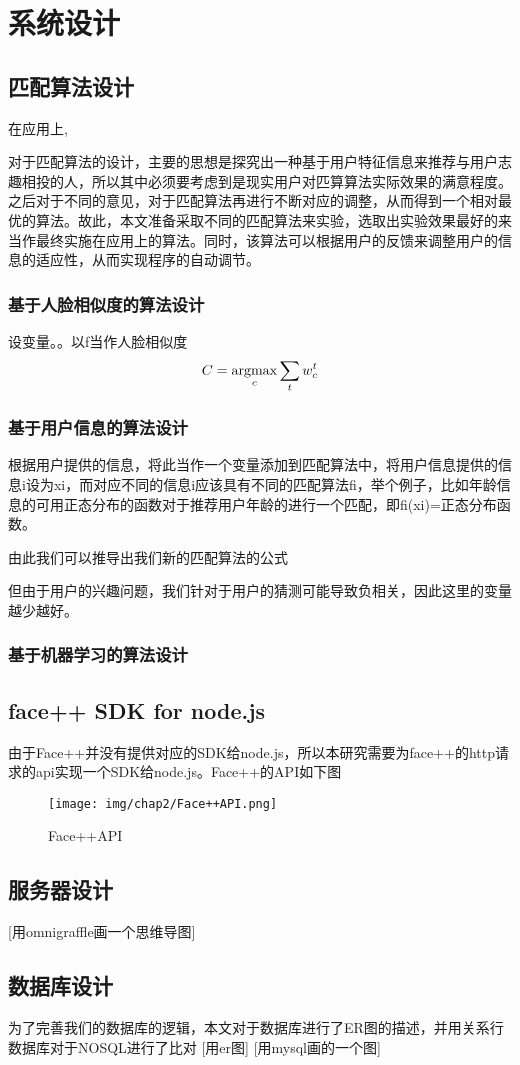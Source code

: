 
\chapter{系统设计}

\section{匹配算法设计}
在应用上,

对于匹配算法的设计，主要的思想是探究出一种基于用户特征信息来推荐与用户志趣相投的人，所以其中必须要考虑到是现实用户对匹算算法实际效果的满意程度。之后对于不同的意见，对于匹配算法再进行不断对应的调整，从而得到一个相对最优的算法。故此，本文准备采取不同的匹配算法来实验，选取出实验效果最好的来当作最终实施在应用上的算法。同时，该算法可以根据用户的反馈来调整用户的信息的适应性，从而实现程序的自动调节。
\subsection{基于人脸相似度的算法设计}
设变量。。以f当作人脸相似度
 \begin{equation}
   C = \mathop{\argmax}_{c}{\sum_t{w^t_c}}%
 \end{equation}

\subsection{基于用户信息的算法设计}
根据用户提供的信息，将此当作一个变量添加到匹配算法中，将用户信息提供的信息i设为xi，而对应不同的信息i应该具有不同的匹配算法fi，举个例子，比如年龄信息的可用正态分布的函数对于推荐用户年龄的进行一个匹配，即fi(xi)=正态分布函数。

由此我们可以推导出我们新的匹配算法的公式

但由于用户的兴趣问题，我们针对于用户的猜测可能导致负相关，因此这里的变量越少越好。
\subsection{基于机器学习的算法设计}


\section{face++ SDK for node.js}
由于Face++并没有提供对应的SDK给node.js，所以本研究需要为face++的http请求的api实现一个SDK给node.js。Face++的API如下图
\begin{figure}[h]
\begin{minipage}[t]{0.45\linewidth}
\centering
\texttt{[image: img/chap2/Face++API.png]}
\caption{Face++API\label{Face++API}}
\end{minipage}
\end{figure}


\section{服务器设计}
[用omnigraffle画一个思维导图]


\section{数据库设计}
为了完善我们的数据库的逻辑，本文对于数据库进行了ER图的描述，并用关系行数据库对于NOSQL进行了比对
[用er图]
[用mysql画的一个图]



